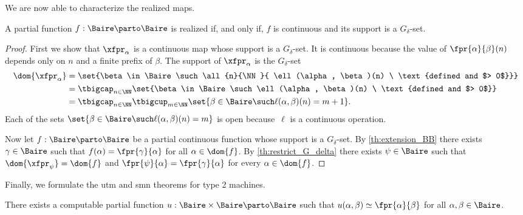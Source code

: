 We are now able to characterize the realized maps.

\begin{theorem}
  A partial function $f: \Baire \parto \Baire$ is realized if, and only
  if, $f$ is continuous and its support is a $G_\delta$-set.
\end{theorem}

\begin{proof}
  First we show that $\xfpr_\alpha$ is a continuous map whose support
  is a $G_\delta$-set. It is continuous because the value of
  $\fpr{\alpha}{\beta}(n)$ depends only on $n$ and a finite prefix of
  $\beta$. The support of $\xfpr_\alpha$ is the $G_\delta$-set
  \begin{align*}
    \dom{\xfpr_\alpha}
    &= \set{\beta \in \Baire \such
      \all{n}{\NN}{
        \ell(\alpha, \beta)(n) \ \text{defined and $> 0$}}} \\
    &= \tbigcap_{n \in \NN}
      \set{\beta \in \Baire \such
        \ell(\alpha, \beta)(n) \ \text{defined and $> 0$}} \\
    &=  \tbigcap_{n \in \NN}
        \tbigcup_{m \in \NN}
          \set{\beta \in \Baire \such
          \ell(\alpha, \beta)(n) = m + 1}.
  \end{align*}
  Each of the sets $\set{\beta \in \Baire \such \ell(\alpha, \beta)(n) = m}$ is open because~$\ell$ is a continuous operation.
  
  Now let $f: \Baire \parto \Baire$ be a partial continuous function
  whose support is a $G_\delta$-set. By \cref{th:extension_BB}
  there exists $\gamma \in \Baire$ such that $f(\alpha) =
  \fpr{\gamma}{\alpha}$ for all $\alpha \in \dom{f}$. By
  \cref{th:restrict_G_delta} there exists $\psi \in \Baire$ such
  that $\dom{\xfpr_\psi} = \dom{f}$ and $\fpr{\psi}{\alpha} =
  \fpr{\gamma}{\alpha}$ for every $\alpha \in \dom{f}$.
\end{proof}

Finally, we formulate the utm and smn theorems for type 2 machines.

\begin{theorem}
  \label{th:type-2-utm}%
  There exists a computable partial function $u : \Baire \times
  \Baire \parto \Baire$ such that $u(\alpha, \beta) \simeq
  \fpr{\alpha}{\beta}$ for all $\alpha, \beta \in \Baire$.
\end{theorem}

